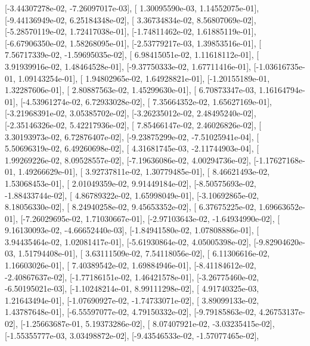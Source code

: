 \documentclass{article}
\begin{document}
       [-3.44307278e-02, -7.26097017e-03],
       [ 1.30095590e-03,  1.14552075e-01],
       [-9.44136949e-02,  6.25184348e-02],
       [ 3.36734834e-02,  8.56807069e-02],
       [-5.28570119e-02,  1.72417038e-01],
       [-1.74811462e-02,  1.61885119e-01],
       [-6.67906350e-02,  1.58268095e-01],
       [-2.53779217e-03,  1.39853516e-01],
       [ 7.56717339e-02, -1.59695035e-02],
       [ 6.98415051e-02,  1.11618112e-01],
       [ 3.91939916e-02,  1.48464528e-01],
       [-9.37750333e-02,  1.67711416e-01],
       [-1.03616735e-01,  1.09143254e-01],
       [ 1.94802965e-02,  1.64928821e-01],
       [-1.20155189e-01,  1.32287606e-01],
       [ 2.80887563e-02,  1.45299630e-01],
       [ 6.70873347e-03,  1.16164794e-01],
       [-4.53961274e-02,  6.72933028e-02],
       [ 7.35664352e-02,  1.65627169e-01],
       [-3.21968391e-02,  3.05385702e-02],
       [-3.26235012e-02,  2.48495240e-02],
       [-2.35146326e-02,  5.42217936e-02],
       [ 7.85466147e-02,  2.46026826e-02],
       [ 3.30193973e-02,  6.72876407e-02],
       [-9.23875299e-02, -7.51025941e-04],
       [ 5.50696319e-02,  6.49260698e-02],
       [ 4.31681745e-03, -2.11744903e-04],
       [ 1.99269226e-02,  8.09528557e-02],
       [-7.19636086e-02,  4.00294736e-02],
       [-1.17627168e-01,  1.49266629e-01],
       [ 3.92737811e-02,  1.30779485e-01],
       [ 8.46621493e-02,  1.53068453e-01],
       [ 2.01049359e-02,  9.91449184e-02],
       [-8.50575693e-02, -1.88433744e-02],
       [ 4.86789322e-02,  1.65998049e-01],
       [-3.10692865e-02,  8.18056330e-02],
       [ 8.24940258e-02,  9.45653352e-02],
       [ 6.37675225e-02,  1.69663652e-01],
       [-7.26029695e-02,  1.71030667e-01],
       [-2.97103643e-02, -1.64934990e-02],
       [ 9.16130093e-02, -4.66652440e-03],
       [-1.84941580e-02,  1.07808886e-01],
       [ 3.94435464e-02,  1.02081417e-01],
       [-5.61930864e-02,  4.05005398e-02],
       [-9.82904620e-03,  1.51794408e-01],
       [ 3.63111509e-02,  7.54118056e-02],
       [ 6.11306616e-02,  1.16603026e-01],
       [ 7.40389542e-02,  1.69884946e-01],
       [-8.41184612e-02, -2.40867637e-02],
       [-1.77186151e-02,  1.46421578e-01],
       [-3.26775460e-02, -6.50195021e-03],
       [-1.10248214e-01,  8.99111298e-02],
       [ 4.91740325e-03,  1.21643494e-01],
       [-1.07690927e-02, -1.74733071e-02],
       [ 3.89099133e-02,  1.43787648e-01],
       [-6.55597077e-02,  4.79150332e-02],
       [-9.79185863e-02,  4.26753137e-02],
       [-1.25663687e-01,  5.19373286e-02],
       [ 8.07407921e-02, -3.03235415e-02],
       [-1.55355777e-03,  3.03498872e-02],
       [-9.43546533e-02, -1.57077465e-02],
\end{document}

